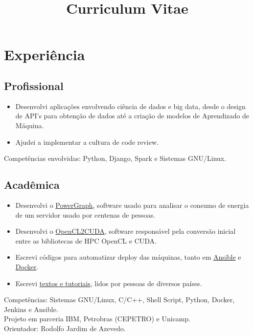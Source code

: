\documentclass[10pt, a4paper, roman]{moderncv} %
\title{Curriculum Vitae}
\begin{document}
\makecvtitle %

\section{Experiência}

\subsection{Profissional}

{
    \begin{itemize}
        \item Desenvolvi aplicações envolvendo ciência de dados e big data, desde o design de API's para obtenção de dados até a criação de modelos de Aprendizado de Máquina.
        \item Ajudei a implementar a cultura de code review.
    \end{itemize}
    Competências envolvidas: Python, Django, Spark e Sistemas GNU/Linux.
}

\subsection{Acadêmica}
{
    \begin{itemize}
        \item Desenvolvi o \href{https://github.com/Guilhermeslucas/powergraph}{PowerGraph}, software usado para analisar o consumo de energia de um servidor usado por centenas de pessoas.
        \item Desenvolvi o \href{https://github.com/Guilhermeslucas/OpenCL2CUDA}{OpenCL2CUDA}, software responsável pela conversão inicial entre as bibliotecas de HPC OpenCL e CUDA.
        \item Escrevi códigos para automatizar deploy das máquinas, tanto em \href{https://github.com/Guilhermeslucas/Ansible-Code}{Ansible} e 
            \href{https://github.com/Guilhermeslucas/Dockerfiles}{Docker}.
        \item Escrevi \href{http://openpower.ic.unicamp.br/blog/}{textos e tutoriais}, lidos por pessoas de diversos países. 
    \end{itemize}
    Competências: Sistemas GNU/Linux, C/C++, Shell Script, Python, Docker, Jenkins e Ansible.\\ 
    Projeto em parceria IBM, Petrobras (CEPETRO) e Unicamp.\\
    Orientador: Rodolfo Jardim de Azevedo.
}
\end{document}
